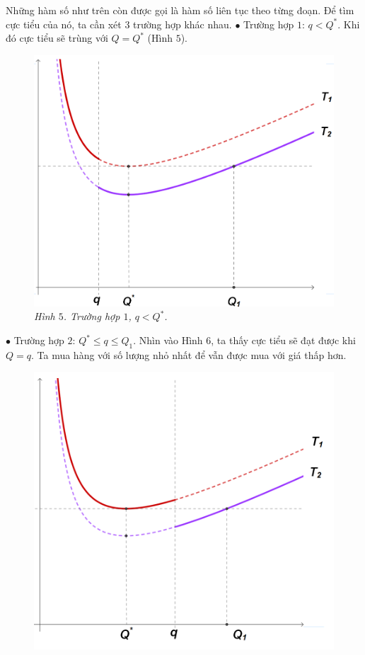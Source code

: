 \begin{multicols}{2}
	Những hàm số như trên còn được gọi là hàm số liên tục theo từng đoạn. Để tìm cực tiểu của nó, ta cần xét $3$ trường hợp khác nhau.
	\vskip 0.1cm
	$\bullet$ Trường hợp $1$: $q<Q^*$.  Khi đó cực tiểu sẽ trùng với $Q=Q^*$ (Hình $5$).
	\begin{figure}[H]
		\vspace*{-5pt}
		\centering
		\captionsetup{labelformat= empty, justification=centering}
		\includegraphics[width= 1\linewidth]{6}
		\caption{\small\textit{\color{toanhocdoisong}Hình $5$. Trường hợp $1$, $q<Q^*$.}}
		\vspace*{-10pt}
	\end{figure}
	$\bullet$ Trường hợp $2$: $Q^* \le q \le Q_1$. Nhìn vào Hình $6$, ta thấy cực tiểu sẽ đạt được khi $Q=q$. Ta mua hàng với số lượng nhỏ nhất để vẫn được mua với giá thấp hơn.
	\begin{figure}[H]
		\vspace*{-5pt}
		\centering
		\captionsetup{labelformat= empty, justification=centering}
		\includegraphics[width= 1\linewidth]{7}

\end{figure}
\end{multicols}
